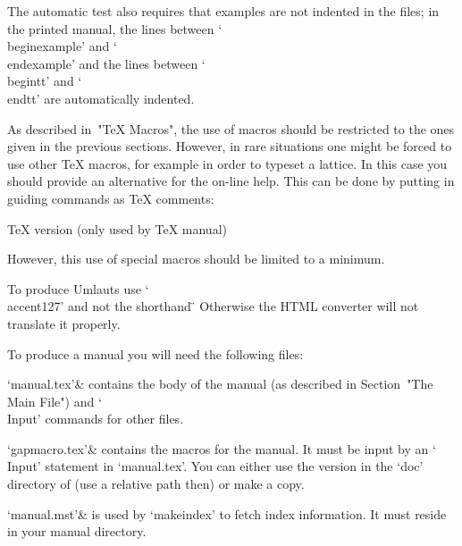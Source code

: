 The automatic test also requires that examples are not indented
in the files;
in the printed manual,
the lines between `\\beginexample' and `\\endexample'
and the lines between `\\begintt' and `\\endtt' are automatically
indented.




As  described in~"TeX Macros", the use of  macros should be restricted to
the ones given in the previous sections.  However, in rare situations one
might be forced to use other {\TeX} macros,
for example  in order  to  typeset a lattice.
In this case you should provide an alternative for the on-line help.
This can be done by putting in guiding commands as {\TeX} comments:

\begintt
TeX version (only used by TeX manual)
\endtt

However, this use of special macros should be limited to a minimum.

To produce Umlauts use `\\accent127' and not the shorthand
\beginverbatim
\"
\endverbatim
Otherwise the HTML converter will not translate it properly.


To produce a manual you will need the following files:

\beginitems
`manual.tex'&
    contains the body of the manual
    (as described in Section~"The Main File")
    and `\\Input' commands for other files.

`gapmacro.tex'&
    contains the macros for the manual.
    It must be input by an `\\Input' statement in `manual.tex'.
    You can either use the version in the `doc' directory of {\GAP}
    (use a relative path then) or make a copy.

`manual.mst'&
    is used by `makeindex' to fetch index information.
    It must reside in your manual directory.

